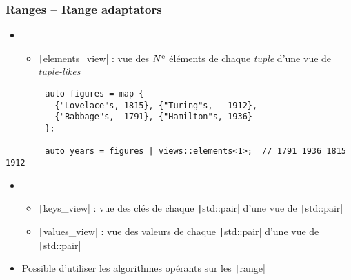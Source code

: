 \documentclass[C++.tex]{subfiles}
\begin{document}
\begin{frame}[fragile]
	\frametitle{Ranges -- Range adaptators}
	\begin{itemize}
		\item [] \begin{itemize}
			\item \texttt|elements_view| : vue des $N\textsuperscript{e}$ éléments de chaque \textit{tuple} d'une vue de \textit{tuple-likes}
		\end{itemize}
	\end{itemize}

	\begin{verbatim}
		auto figures = map {
		  {"Lovelace"s, 1815}, {"Turing"s,   1912},
		  {"Babbage"s,  1791}, {"Hamilton"s, 1936}
		};

		auto years = figures | views::elements<1>;  // 1791 1936 1815 1912
	\end{verbatim}

	\begin{itemize}
		\item [] \begin{itemize}
			\item \texttt|keys_view| : vue des clés de chaque \texttt|std::pair| d'une vue de \texttt|std::pair|
			\item \texttt|values_view| : vue des valeurs de chaque \texttt|std::pair| d'une vue de \texttt|std::pair|
		\end{itemize}
	\item Possible d'utiliser les algorithmes opérants sur les \texttt|range|
	\end{itemize}
\end{frame}
\end{document}
